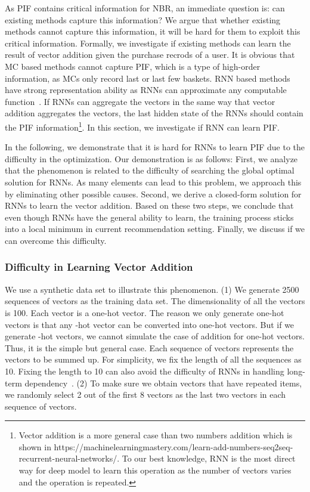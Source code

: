 \documentclass[sigconf]{acmart}
\begin{document}
As PIF contains critical  information for NBR, an  immediate question is: can existing  methods capture this  information? We argue that whether  existing methods cannot capture this information, it will be hard for them to exploit this  critical information. Formally, we investigate if existing methods can learn the result of vector  addition   given the purchase recrods of a user. It is obvious that MC based methods cannot capture PIF, which is a type of high-order information, as MCs  only record last or last few  baskets. RNN based methods  have strong representation ability as RNNs can approximate any  computable  function~\cite{siegelmann1992computational}.  If RNNs can  aggregate the vectors in the same way that vector addition aggregates the  vectors, the last hidden state of the RNNs should contain the PIF information\footnote{Vector addition is a  more general case than two numbers addition which is shown in https://machinelearningmastery.com/learn-add-numbers-seq2seq-recurrent-neural-networks/. To our best knowledge, RNN is the most direct way for deep model to learn this operation as the number of vectors varies and the operation is repeated.}. In this section, we investigate if RNN can learn PIF. 

In the following, we  demonstrate that it is hard  for RNNs to learn PIF due to the  difficulty in the optimization. Our demonstration is as follows: First, we  analyze that the phenomenon is  related to the difficulty of searching the global  optimal solution for RNNs. As many  elements can lead to this problem, we  approach this  by eliminating other possible  causes. Second, we derive  a closed-form solution for  RNNs to learn the vector addition. Based on these two steps, we conclude that  even though RNNs have the general ability to learn, the training process sticks  into a local  minimum in current  recommendation setting. Finally, we discuss if we can overcome this  difficulty.

\subsubsection{Difficulty in Learning Vector Addition}

We use a  synthetic data set to illustrate this phenomenon. (1) We generate  2500 sequences of vectors  as the training data set. The dimensionality of all the vectors is  100. Each vector is a one-hot vector. The reason we only generate one-hot vectors is that any -hot vector can be converted into  one-hot vectors. But if we generate -hot vectors, we cannot simulate the  case of  addition for  one-hot  vectors.  Thus, it is the simple but  general case.   Each sequence of vectors represents the vectors to be summed up. For simplicity, we fix the length of all the sequences  as 10. Fixing the length to  10 can also avoid the  difficulty  of RNNs in handling long-term dependency~\cite{pascanu2013difficulty}. (2) To make sure we obtain vectors that have  repeated items, we randomly select 2 out of the first 8 vectors as the last two vectors in each sequence of vectors. 
\end{document}
